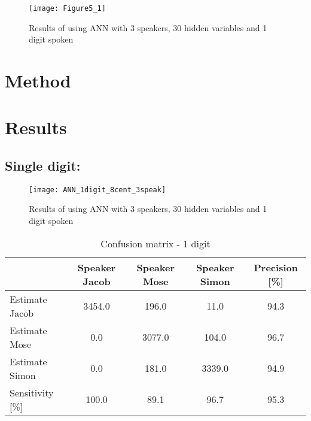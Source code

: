 \begin{figure}[H]
\centering
\texttt{[image: Figure5\_1]}
\caption{Results of using ANN with 3 speakers, 30 hidden variables and 1 digit spoken}
\label{fig:ANN_fig_theory}
\end{figure}

\section{Method}



\section{Results}


\subsection{Single digit:}
\begin{figure}[H]
\centering
\texttt{[image: ANN\_1digit\_8cent\_3speak]}
\caption{Results of using ANN with 3 speakers, 30 hidden variables and 1 digit spoken}
\label{fig:ANN_fig_1}
\end{figure}

\begin{table}[H]                                                    
\centering                                                          
\begin{tabular}{|l|c|c|c|c|}                                        
\hline                                                              
  & Speaker Jacob & Speaker Mose & Speaker Simon & Precision [\%] \\
\hline                                                              
Estimate Jacob & 3454.0 & 196.0 & 11.0 & 94.3 \\                    
\hline                                                              
Estimate Mose & 0.0 & 3077.0 & 104.0 & 96.7 \\                      
\hline                                                              
Estimate Simon & 0.0 & 181.0 & 3339.0 & 94.9 \\                     
\hline                                                              
Sensitivity [\%] & 100.0 & 89.1 & 96.7 & 95.3 \\                    
\hline                                                              
\end{tabular}                                                       
\caption{Confusion matrix - 1 digit}                                
\label{table:ANN_conf_1}                                            
\end{table}  



